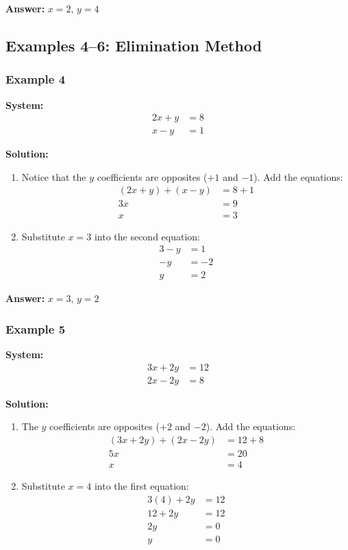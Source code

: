\documentclass{article}
\begin{document}
\textbf{Answer:} $x = 2, \, y = 4$ \,  

\subsection{Examples 4--6: Elimination Method}

\subsubsection{Example 4}

\textbf{System:}
\begin{align*}
2x + y &= 8 \\
x - y &= 1
\end{align*}

\textbf{Solution:}

\begin{enumerate}
    \item Notice that the $y$ coefficients are opposites ($+1$ and $-1$). Add the equations:
    \begin{align*}
        (2x + y) + (x - y) &= 8 + 1 \\
        3x &= 9 \\
        x &= 3
    \end{align*}
    \item Substitute $x = 3$ into the second equation:
    \begin{align*}
        3 - y &= 1 \\
        -y &= -2 \\
        y &= 2
    \end{align*}
\end{enumerate}

\textbf{Answer:} $x = 3, \, y = 2$ \,  

\subsubsection{Example 5}

\textbf{System:}
\begin{align*}
3x + 2y &= 12 \\
2x - 2y &= 8
\end{align*}

\textbf{Solution:}

\begin{enumerate}
    \item The $y$ coefficients are opposites ($+2$ and $-2$). Add the equations:
    \begin{align*}
        (3x + 2y) + (2x - 2y) &= 12 + 8 \\
        5x &= 20 \\
        x &= 4
    \end{align*}
    \item Substitute $x = 4$ into the first equation:
    \begin{align*}
        3(4) + 2y &= 12 \\
        12 + 2y &= 12 \\
        2y &= 0 \\
        y &= 0
    \end{align*}
\end{enumerate}
\end{document}

